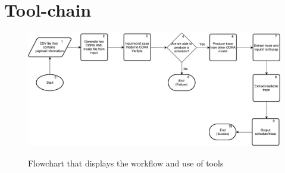 \section{Tool-chain} \label{sec:tool_chain}

\begin{figure}[h]
	\includegraphics[width=\textwidth]{graphics/tool1.pdf}
	\label{fig:tool1}
	\caption{Flowchart that displays the workflow and use of tools}
\end{figure}
